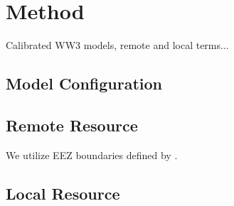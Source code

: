 \documentclass[authoryear,preprint]{elsarticle}
\begin{document}
\section{Method}

Calibrated WW3 models, remote and local terms...

\subsection{Model Configuration}

\subsection{Remote Resource}

We utilize EEZ boundaries defined by \citep[]{flandersmarineinstituteMaritimeBoundariesGeodatabase}.

\subsection{Local Resource}
\end{document}
